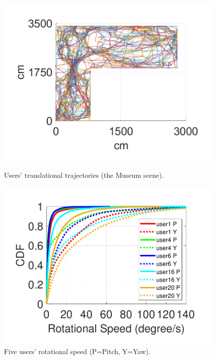 \begin{figure}[t]
	\centering
	\begin{minipage}{.45\textwidth}
		\centering
		\includegraphics[width=\linewidth]{figs/firefly/museum_trajectory.pdf}
		\caption{\small Users' translational trajectories (the Museum scene).}
		\label{fig:museum_trajectory}
	\end{minipage}
	\begin{minipage}{.45\textwidth}
		\centering
		\includegraphics[width=\linewidth]{figs/firefly/angular_velocity.pdf}
		\caption{\small Five users' rotational speed (P=Pitch, Y=Yaw).}
		\label{fig:angular_velocity}
	\end{minipage}
\end{figure}


